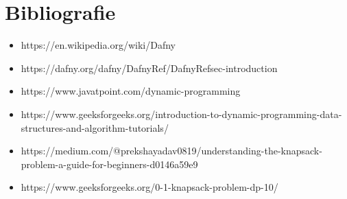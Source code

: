 \chapter*{Bibliografie} 
\begin{sloppypar}

\begin{itemize}
    \item https://en.wikipedia.org/wiki/Dafny
    \item https://dafny.org/dafny/DafnyRef/DafnyRef{\texthash}sec-introduction
    \item https://www.javatpoint.com/dynamic-programming
    \item https://www.geeksforgeeks.org/introduction-to-dynamic-programming-data-structures-and-algorithm-tutorials/
    \item https://medium.com/@prekshayadav0819/understanding-the-knapsack-problem-a-guide-for-beginners-d0146a59e9
    \item https://www.geeksforgeeks.org/0-1-knapsack-problem-dp-10/
\end{itemize}
\end{sloppypar}